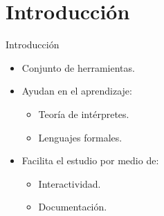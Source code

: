 \documentclass[spanish]{beamer}
\begin{document}



\section{Introducción}
\begin{frame}{Introducción}
    \begin{itemize}
        \item Conjunto de herramientas.
        \item Ayudan en el aprendizaje:
        \begin{itemize}
            \item Teoría de intérpretes.
            \item Lenguajes formales.
        \end{itemize}
         \item Facilita el estudio por medio de:
         \begin{itemize}
            \item Interactividad.
            \item Documentación.
        \end{itemize}
    \end{itemize}
\end{frame}
\end{document}
